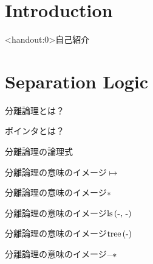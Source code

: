 \documentclass[notheorems, aspectratio=169, 12pt, unicode]{beamer}
\begin{document}
\begin{frame}
 \titlepage
\end{frame}

\section{Introduction}

\begin{frame}<handout:0>{自己紹介}
 
\end{frame}

\section{Separation Logic}

\begin{frame}{分離論理とは？}
 
\end{frame}

\begin{frame}{ポインタとは？}
 
\end{frame}

\begin{frame}{分離論理の論理式}
 
\end{frame}

\begin{frame}{分離論理の意味のイメージ}{$\mapsto$}
 
\end{frame}

\begin{frame}{分離論理の意味のイメージ}{$\mathrel{\ast}$}
 
\end{frame}

\begin{frame}{分離論理の意味のイメージ}{$\mathprls{\mathdash}{\mathdash}$}
 
\end{frame}

\begin{frame}{分離論理の意味のイメージ}{$\mathprtree{\mathdash}$}
 
\end{frame}

\begin{frame}{分離論理の意味のイメージ}{$\mathrel{\text{---}\!\!*}$}
 
\end{frame}
\end{document}
